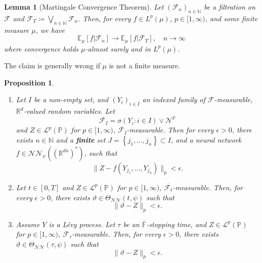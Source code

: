 \documentclass[11pt,a4paper,twoside,openany]{report}
\theoremstyle{plain} %
\newtheorem{proposition}[proposition]{Proposition}
\newtheorem{lemma}[lemma]{Lemma}
\theoremstyle{definition} %
\theoremstyle{remark} %
\begin{document}
\begin{lemma}[Martingale Convergence Theorem]\label{lemma:Martingale Convergence Theorem}
    Let \((\mathcal{F}_n)_{n\in\mathbb{N}}\) be a filtration on \(\mathcal{F}\) and \(\mathcal{F}_{T}\coloneqq\bigvee_{n\in\mathbb{N}}\mathcal{F}_n\). Then, for every \(f\in L^p(\mu)\), \(p\in[1,\infty)\), and some finite measure \(\mu\), we have
    \begin{equation}
        \mathbb{E}_{\mu}[f|\mathcal{F}_n]\to\mathbb{E}_{\mu}[f|\mathcal{F}_{T}],\quad n\to\infty
    \end{equation}
 where convergence holds \(\mu\)-almost surely and in \(L^p(\mu)\).
\end{lemma}
The claim is generally wrong if \(\mu\) is not a finite measure.
\begin{proposition}\label{prop:approximation of measurable maps by algorithmic strategies}
\begin{enumerate}
    \item Let \(I\) be a non-empty set, and \((Y_i)_{i\in I}\) an indexed family of \(\mathcal{F}\)-measurable, \(\mathbb{R}^d\)-valued random variables. Let 
    \begin{equation}
        \overline{\mathcal{F}_I}=\sigma(Y_i:i\in I)\vee\mathcal{N}^\mathbb{P}
    \end{equation}
    and \(Z\in\mathcal{L}^p(\mathbb{P})\) for \(p\in[1,\infty)\), \(\overline{\mathcal{F}_I}\)-measurable. Then for every \(\epsilon>0\), there exists \(n\in\mathbb{N}\) and a \textbf{finite} set \(J=\left\{j_1,\dots,j_n\right\}\subset I\), and a neural network \(f\in\mathcal{NN}_\psi((\mathbb{R}^{dn})^*)\), such that 
    \begin{equation}
        \lVert Z-f(Y_{j_1},\dots, Y_{j_n})\rVert_{p}<\epsilon.
    \end{equation}
    \item Let \(t\in[0,T]\) and \(Z\in\mathcal{L}^p(\mathbb{P})\) for \(p\in[1,\infty)\), \(\overline{\mathcal{F}_t}\)-measurable. Then, for every \(\epsilon>0\), there exists \(\vartheta\in\Theta_{\mathcal{NN}}(t,\psi)\) such that 
    \begin{equation}
        \lVert \vartheta-Z\rVert_{p}<\epsilon.
    \end{equation}
    \item Assume \(Y\) is a Lévy process. Let \(\tau\) be an \(\overline{\mathbb{F}}\)-stopping time, and \(Z\in\mathcal{L}^p(\mathbb{P})\) for \(p\in[1,\infty)\), \(\overline{\mathcal{F}}_{\tau}\)-measurable. Then, for every \(\epsilon>0\), there exists \(\vartheta\in\Theta_{\mathcal{NN}}(\tau,\psi)\) such that 
    \begin{equation}
        \lVert \vartheta-Z\rVert_{p}<\epsilon.
    \end{equation}
\end{enumerate}
\end{proposition}
\end{document}
